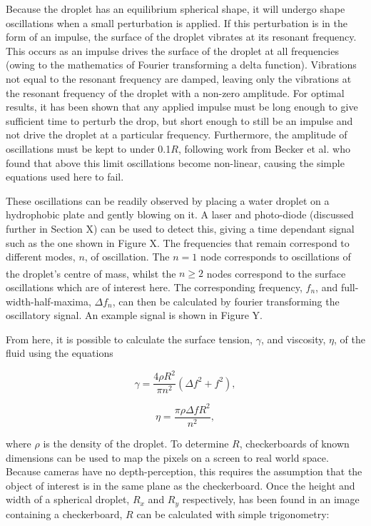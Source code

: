 \documentclass{physics_article_B}
\begin{document}
Because the droplet has an equilibrium spherical shape, it will undergo shape oscillations when a small perturbation is applied\cite{oscillate}. If this perturbation is in the form of an impulse, the surface of the droplet vibrates at its resonant frequency. This occurs as an impulse drives the surface of the droplet at all frequencies (owing to the mathematics of Fourier transforming a delta function). Vibrations not equal to the resonant frequency are damped, leaving only the vibrations at the resonant frequency of the droplet with a non-zero amplitude. For optimal results, it has been shown that any applied impulse must be long enough to give sufficient time to perturb the drop, but short enough to still be an impulse and not drive the droplet at a particular frequency\cite{temperton}. Furthermore, the amplitude of oscillations must be kept to under 0.1$R$, following work from Becker et al. who found that above this limit oscillations become non-linear, causing the simple equations used here to fail\cite{becker}.
    
These oscillations can be readily observed by placing a water droplet on a hydrophobic plate and gently blowing on it. A laser and photo-diode (discussed further in Section X) can be used to detect this, giving a time dependant signal such as the one shown in Figure X. The frequencies that remain correspond to different modes, $n$, of oscillation. The $n=1$ node corresponds to oscillations of the droplet's centre of mass\textsuperscript{\cite{miller}}, whilst the $n\geq2$ nodes correspond to the surface oscillations which are of interest here. The corresponding frequency, $f_n$, and full-width-half-maxima, $\Delta f_n$, can then be calculated by fourier transforming the oscillatory signal. An example signal is shown in Figure Y. 
    
From here, it is possible to calculate the surface tension, $\gamma$, and viscosity, $\eta$, of the fluid using the equations
 
    \begin{equation} 
    \label{eq:SurfaceTension}
    \gamma = \frac{4\rho R^{2}}{\pi n^{2}}(\Delta f^{2} + f^{2}),
    \end{equation}
    
    \begin{equation} 
    \label{eq:Viscosity}
    \eta = \frac{\pi \rho \Delta f R^{2}}{n^{2}},
    \end{equation}

where $\rho$ is the density of the droplet. To determine $R$, checkerboards of known dimensions can be used to map the pixels on a screen to real world space. Because cameras have no depth-perception, this requires the assumption that the object of interest is in the same plane as the checkerboard. Once the height and width of a spherical droplet, $R_x$ and $R_y$ respectively, has been found in an image containing a checkerboard, $R$ can be calculated with simple trigonometry:
            
\end{document}
